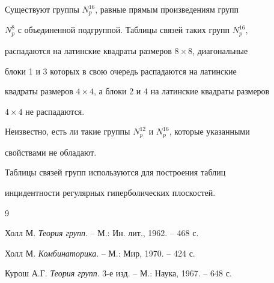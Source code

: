 Существуют группы $N^{16}_p$, равные прямым произведениям групп


$N^8_p$ с объединенной подгруппой. Таблицы связей таких групп $N^{16}_p$,


распадаются на латинские квадраты размеров $8\times 8$, диагональные


блоки 1 и 3 которых в свою очередь распадаются на латинские 


квадраты размеров $4\times 4$, а блоки 2 и 4 на латинские квадраты размеров


$4\times 4$ не распадаются.





Неизвестно, есть ли такие группы $N^{12}_p$ и $N^{16}_p$, которые указанными


свойствами не обладают.





Таблицы связей групп используются для построения таблиц 


инцидентности регулярных гиперболических плоскостей.





\begin{thebibliography}{9}







Холл М. {\em Теория групп}. -- М.: Ин. лит., 1962. -- 468 с.




Холл М. {\em Комбинаторика}. -- М.: Мир, 1970. -- 424 с.




Курош А.Г. {\em Теория групп}. 3-е изд. -- М.: Наука, 1967. -- 648 с.





\end{thebibliography}





\vskip 2cm












\label{end}














